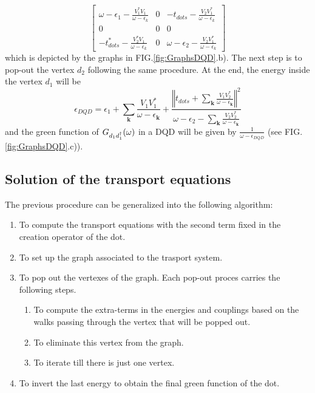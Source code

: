 \documentclass[showpacs,aps,prb,reprint,superscriptaddress]{revtex4-1}
\begin{document}
\begin{equation}
        \left[\begin{array}{ccc}
    \omega-\epsilon_{1}-\frac{V_{1}^{*}V_{1}}{\omega-\epsilon_{k}} & 0 & -t_{dots}-\frac{V_{2}V_{1}^{*}}{\omega-\epsilon_{k}}\\
    0 & 0 & 0\\
    -t_{dots}^{*}-\frac{V_{2}^{*}V_{1}}{\omega-\epsilon_{k}} & 0 & \omega-\epsilon_{2}-\frac{V_{2}V_{1}^{*}}{\omega-\epsilon_{k}}
    \end{array}\right]
\end{equation}
\noindent which is depicted by the graphs in FIG.\ref{fig:GraphsDQD}.b). The next step is to pop-out the vertex $d_2$ following the same procedure. At the end, the energy inside the vertex $d_1$ will be
\begin{equation}
    \epsilon_{DQD}=\epsilon_{1}+\sum_{\mathbf{k}}\frac{V_{1}V_{1}^{*}}{\omega-\epsilon_{\mathbf{k}}}+\frac{\left\Vert t_{dots}+\sum_{\mathbf{k}}\frac{V_{1}V_{2}^{*}}{\omega-\epsilon_{\mathbf{k}}}\right\Vert ^{2}}{\omega-\epsilon_{2}-\sum_{\mathbf{k}}\frac{V_{2}V_{2}^{*}}{\omega-\epsilon_{\mathbf{k}}}} \label{eq:EnDQD}
\end{equation}
and the green function of $G_{d_1d^\dagger_1}(\omega)$ in a DQD will be given by $\frac{1}{\omega -  \epsilon_{DQD}}$ (see FIG.\ref{fig:GraphsDQD}.c)).

\subsection{Solution of the transport equations}

The previous procedure can be generalized into the following algorithm:

\begin{enumerate}
    \item To compute the transport equations with the second term fixed in the creation operator of the dot.
     \item To set up the  graph associated to the trasport system.
    \item To pop out the vertexes of the graph. Each pop-out proces carries the following steps.
    \begin{enumerate}
        \item To compute the extra-terms in the energies and couplings based on the walks passing through the vertex that will be popped out.
        \item To eliminate this vertex from the graph. 
        \item To iterate till there is just one  vertex.
        \end{enumerate}
    \item To invert the last energy to obtain the final green function of the dot.
\end{enumerate}
\end{document}
